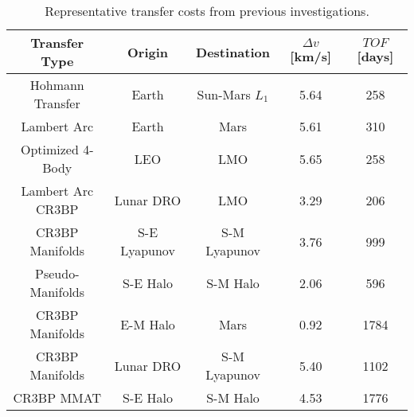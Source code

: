 \begin{table}[ht]
    \centering
    \caption{Representative transfer costs from previous investigations.}
    \begin{tabular}{|c|c|c|c|c|}
        \hline
        \textbf{Transfer Type}                      &   \textbf{Origin} &   \textbf{Destination}    &   \boldmath$\Delta v$ \textbf{[km/s]} &   \boldmath$TOF$ \textbf{[days]}  \\  \hline
        Hohmann Transfer                            &   Earth           &   Sun-Mars $L_{1}$        &   5.64                                &   258                             \\  \hline
        Lambert Arc\cite{Eagle:2022}                &   Earth           &   Mars                    &   5.61                                &   310                             \\  \hline
        Optimized 4-Body\cite{Miele:1999}           &   LEO             &   LMO                     &   5.65                                &   258                             \\  \hline
        Lambert Arc CR3BP\cite{Conte:2017}          &   Lunar DRO       &   LMO                     &   3.29                                &   206                             \\  \hline
        CR3BP Manifolds\cite{Topputo:2005}          &   S-E Lyapunov    &   S-M Lyapunov            &   3.76                                &   999                             \\  \hline
        Pseudo-Manifolds\cite{Haibin:2014}          &   S-E Halo        &   S-M Halo                &   2.06                                &   596                             \\  \hline
        CR3BP Manifolds\cite{Kakoi:2014}            &   E-M Halo        &   Mars                    &   0.92                                &   1784                            \\  \hline
        CR3BP Manifolds\cite{Cavallari:2019}        &   Lunar DRO       &   S-M Lyapunov            &   5.40                                &   1102                            \\  \hline
        CR3BP MMAT\cite{Canales:2022}               &   S-E Halo        &   S-M Halo                &   4.53                                &   1776                            \\  \hline
    \end{tabular}
    \label{tab:transferCosts}
\end{table}

